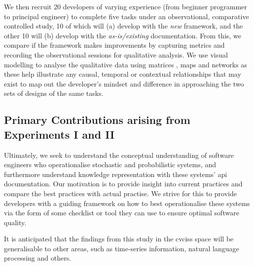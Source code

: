 We then recruit 20 developers of varying experience (from beginner programmer to principal engineer) to complete five tasks under an observational, comparative controlled study, 10 of which will (a) develop with the \textit{new} framework, and the other 10 will (b) develop with the \textit{as-is/existing} documentation. From this, we compare if the framework makes improvements by capturing metrics and recording the observational sessions for qualitative analysis. We use visual modelling to analyse the qualitative data using matrices \citep{Dey:2003ty}, maps and networks \citep{Miles:1994ty} as these help illustrate any causal, temporal or contextual relationships that may exist to map out the developer's mindset and difference in approaching the two sets of designs of the same tasks.


\subsection{Primary Contributions arising from Experiments I and II}
\label{ssec:research-methodology:experiments:contribution}

Ultimately, we seek to understand the conceptual understanding of software engineers who operationalise stochastic and probabilistic systems, and furthermore understand knowledge representation with these systems' \gls{api} documentation. Our motivation is to provide insight into current practices and compare the best practices with actual practise. We strive for this to  provide developers with a guiding framework on how to best operationalise these systems via the form of some checklist or tool they can use to ensure optimal software quality.

It is anticipated that the findings from this study in the \glspl{cvcis} space will be generalisable to other areas, such as time-series information, natural language processing and others.
